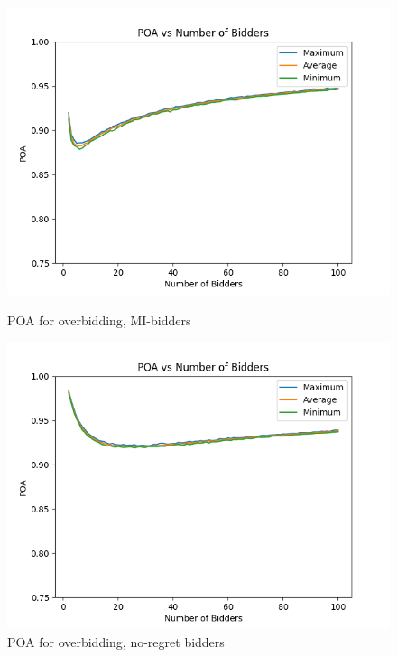 \documentclass[12pt,twoside]{reedthesis}
\begin{document}
\begin{figure}
	\centering
	\begin{minipage}{0.49\textwidth}
		\centering
		\includegraphics[scale=0.5]{Figures/zi_symmetric_overbidding}
		\caption{POA for overbidding, MI-bidders}
		\label{figure:mi_overbidders}
	\end{minipage}
	\begin{minipage}{0.49\textwidth}
		\centering
		\includegraphics[scale=0.5]{Figures/symmetric_overbidding}
		\caption{POA for overbidding, no-regret bidders}
		\label{figure:overbidders}
	\end{minipage}
\end{figure}
\end{document}
